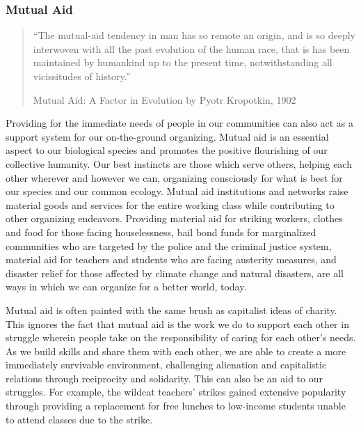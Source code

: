 \documentclass[10pt]{memoir}
\def \href #1#2{#2} %
\begin{document}
\subsubsection{Mutual Aid}\label{mutual-aid}

\begin{quote}
``The mutual-aid tendency in man has so remote an origin, and is so
deeply interwoven with all the past evolution of the human race, that is
has been maintained by humankind up to the present time, notwithstanding
all vicissitudes of history.''

\href{https://theanarchistlibrary.org/library/petr-kropotkin-mutual-aid-a-factor-of-evolution}{Mutual
Aid: A Factor in Evolution} by Pyotr Kropotkin, 1902
\end{quote}

Providing for the immediate needs of people in our communities can also
act as a support system for our on-the-ground organizing. Mutual aid is
an essential aspect to our biological species and promotes the positive
flourishing of our collective humanity. Our best instincts are those
which serve others, helping each other wherever and however we can,
organizing consciously for what is best for our species and our common
ecology. Mutual aid institutions and networks raise material goods and
services for the entire working class while contributing to other
organizing endeavors. Providing material aid for striking workers,
clothes and food for those facing houselessness, bail bond funds for
marginalized communities who are targeted by the police and the criminal
justice system, material aid for teachers and students who are facing
austerity measures, and disaster relief for those affected by climate
change and natural disasters, are all ways in which we can organize for
a better world, today.

Mutual aid is often painted with the same brush as capitalist ideas of
charity. This ignores the fact that mutual aid is the work we do to
support each other in struggle wherein people take on the responsibility
of caring for each other's needs. As we build skills and share them with
each other, we are able to create a more immediately survivable
environment, challenging alienation and capitalistic relations through
reciprocity and solidarity. This can also be an aid to our struggles.
For example, the wildcat teachers' strikes gained extensive popularity
through providing a replacement for free lunches to low-income students
unable to attend classes due to the strike.
\end{document}
